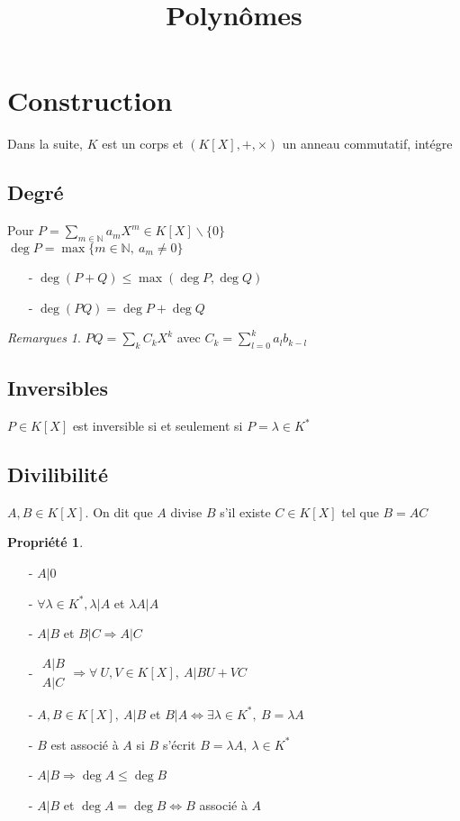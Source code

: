 \documentclass[fleqn]{article}
\title{Polyn\^omes}
\date{}
\theoremstyle{definition} \newtheorem*{defi}{D\'efinition}
\theoremstyle{definition} \newtheorem*{theo}{Th\'eor\`eme}
\theoremstyle{definition} \newtheorem*{coro}{Corollaire}
\theoremstyle{definition} \newtheorem*{nota}{Notation}
\theoremstyle{remark} \newtheorem*{rqs}{Remarques}
\theoremstyle{definition} \newtheorem*{prop}{Propri\'et\'e}
\begin{document}
\maketitle

\section{Construction}
Dans la suite, $K$ est un corps et $(K[X], + , \times)$ un anneau commutatif, int\'egre
\subsection{Degr\'e}
Pour $P =  \sum_{m \in \mathbb{N}} a_m X^m \in K[X]\backslash \{0\}$ \\
$\deg P = \max \{m \in \mathbb{N},\ a_m \neq 0\}$

\begin{itemize}
	\item [-] $\deg (P+Q) \leq \max (\deg P, \deg Q)$
	\item [-] $\deg (PQ) = \deg P + \deg Q$
\end{itemize}

\begin{rqs}
	$PQ = \sum_k C_k X^k$ avec $C_k = \sum_{l=0}^k a_l b_{k-l}$
\end{rqs}

\subsection{Inversibles}
$P \in K[X]$ est inversible si et seulement si $P = \lambda \in K^*$

\subsection{Divilibilit\'e}
$A, B \in K[X]$. On dit que $A$ divise $B$ s'il existe $C \in K[X]$ tel que $B = AC$

\begin{prop} $ $
	\begin{itemize}
		\item [-] $A | 0$
		\item [-] $\forall \lambda \in K^*, \lambda | A$ et $\lambda A | A$
		\item [-] $A | B$ et $B|C \Rightarrow A | C$
		\item [-]
			$\left. \begin{array}{l}
				A | B \\
				A | C
			\end{array}\right. \Rightarrow \forall\ U, V \in K[X],\ A |  BU + VC$
		\item [-] $A,B \in K[X],\ A|B$ et $B|A \Leftrightarrow \exists \lambda \in K^*,\ B = \lambda A$
		\item [-] $B$ est associ\'e \`a $A$ si $B$ s'\'ecrit $B = \lambda A,\ \lambda \in K^*$
		\item [-] $A | B \Rightarrow \deg A \leq \deg B$
		\item [-] $A|B$ et $\deg A = \deg B \Leftrightarrow B$ associ\'e \`a $A$
	\end{itemize}
\end{prop}
\end{document}
